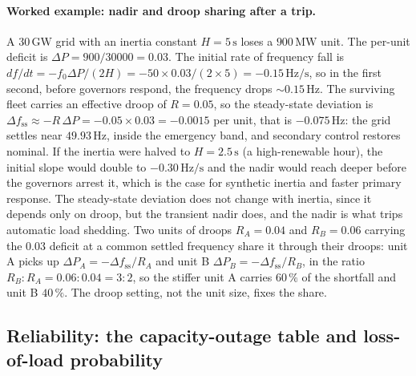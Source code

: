 

\paragraph{Worked example: nadir and droop sharing after a trip.} A
$30\,\si{\giga\watt}$ grid with an inertia constant $H = 5\,\si{\second}$
loses a $900\,\si{\mega\watt}$ unit. The per-unit deficit is $\Delta P =
900/30000 = 0.03$. The initial rate of frequency fall is $df/dt = -f_0 \Delta
P/(2H) = -50 \times 0.03/(2\times 5) = -0.15\,\si{\hertz}/\si{\second}$, so in
the first second, before governors respond, the frequency drops $\sim 0.15\,
\si{\hertz}$. The surviving fleet carries an effective droop of $R = 0.05$, so
the steady-state deviation is $\Delta f_{\text{ss}} \approx -R\,\Delta P =
-0.05\times 0.03 = -0.0015$ per unit, that is $-0.075\,\si{\hertz}$: the grid
settles near $49.93\,\si{\hertz}$, inside the emergency band, and secondary
control restores nominal. If the inertia were halved to $H = 2.5\,\si{\second}$
(a high-renewable hour), the initial slope would double to $-0.30\,\si{\hertz}/
\si{\second}$ and the nadir would reach deeper before the governors arrest it,
which is the case for synthetic inertia and faster primary response. The
steady-state deviation does not change with inertia, since it depends only on
droop, but the transient nadir does, and the nadir is what trips automatic
load shedding. Two units of droops $R_A = 0.04$ and $R_B = 0.06$ carrying the
$0.03$ deficit at a common settled frequency share it through their droops:
unit A picks up $\Delta P_A = -\Delta f_{\text{ss}}/R_A$ and unit B $\Delta
P_B = -\Delta f_{\text{ss}}/R_B$, in the ratio $R_B : R_A = 0.06 : 0.04 = 3 :
2$, so the stiffer unit A carries $60\,\%$ of the shortfall and unit B
$40\,\%$. The droop setting, not the unit size, fixes the share.

\subsection{Reliability: the capacity-outage table and loss-of-load
probability}

